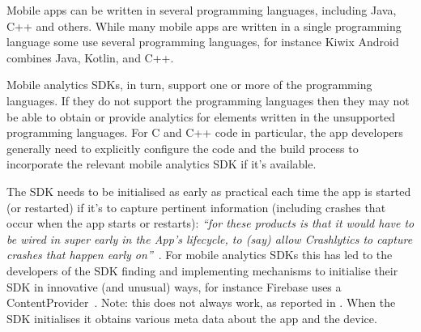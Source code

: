 Mobile apps can be written in several programming languages, including Java, C++ and others. While many mobile apps are written in a single programming language some use several programming languages, for instance Kiwix Android combines Java, Kotlin, and C++. 

Mobile analytics SDKs, in turn, support one or more of the programming languages. If they do not support the programming languages then they may not be able to obtain or provide analytics for elements written in the unsupported programming languages. For C and C++ code in particular, the app developers generally need to explicitly configure the code and the build process to incorporate the relevant mobile analytics SDK if it's available. %



The SDK needs to be initialised as early as practical each time the app is started (or restarted) if it's to capture pertinent information (including crashes that occur when the app starts or restarts): \emph{``for these products is that it would have to be wired in super early in the App's lifecycle, to (say) allow Crashlytics to capture crashes that happen early on''}~. 
For mobile analytics SDKs this has led to the developers of the SDK finding and implementing mechanisms to initialise their SDK in innovative (and unusual) ways, for instance Firebase uses a ContentProvider~. Note: this does not always work, as reported in . When the SDK initialises it obtains various meta data about the app and the device. 

